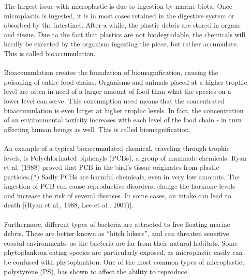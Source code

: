 The largest issue with microplastic is due to ingestion by marine biota. Once microplastic is ingested, it is in most cases retained in the digestive system or absorbed by the intestines. After a while, the plastic debris are stored in organs and tissue. Due to the fact that plastics are not biodegradable, the chemicals will hardly be excreted by the organism ingesting the piece, but rather accumulate. This is called bioaccumulation. 
\\\\
Bioaccumulation creates the foundation of biomagnification, causing the poisoning of entire food chains. Organisms and animals placed at a higher trophic level are often in need of a larger amount of food than what the species on a lower level can serve. This consumption need means that the concentrated bioaccumulation is even larger at higher trophic levels. In fact, the concentration of an environmental toxicity increases with each level of the food chain - in turn affecting human beings as well. This is called biomagnification. 
\\\\
An example of a typical bioaccumulated chemical, traveling through trophic levels, is Polychlorinated biphenyls (PCBs), a group of manmade chemicals. Ryan et al. (1988) proved that PCB in the bird's tissue originates from plastic particles.(*) Sadly PCBs are harmful chemicals, even in very low amounts. The ingestion of PCB can cause reproductive disorders, change the hormone levels and increase the risk of several diseases. In some cases, an intake can lead to death [(Ryan et al., 1988, Lee et al., 2001)].
\\\\
Furthermore, different types of bacteria are attracted to free floating marine debris. These are better known as “hitch hikers”, and can threaten sensitive coastal environments, as the bacteria are far from their natural habitats. 
Some phytoplankton eating species are particularly exposed, as microplastic easily can be confused with phytoplankton. One of the most common types of microplastic, polystyrene (PS), has shown to affect the ability to reproduce. %
\\\\
